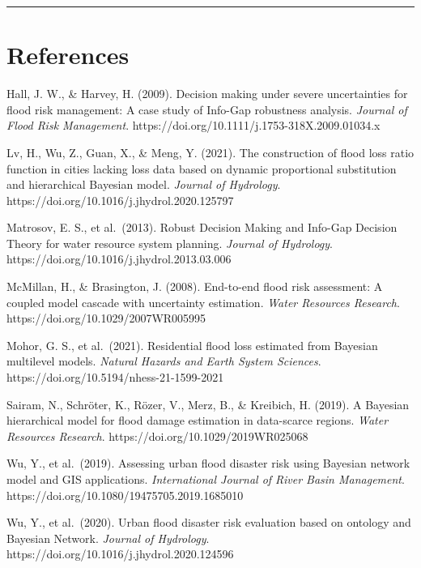 \documentclass[
]{article}
\begin{document}
\begin{center}\rule{0.5\linewidth}{0.5pt}\end{center}

\section{References}\label{references}

Hall, J. W., \& Harvey, H. (2009). Decision making under severe
uncertainties for flood risk management: A case study of Info-Gap
robustness analysis. \emph{Journal of Flood Risk Management}.
https://doi.org/10.1111/j.1753-318X.2009.01034.x

Lv, H., Wu, Z., Guan, X., \& Meng, Y. (2021). The construction of flood
loss ratio function in cities lacking loss data based on dynamic
proportional substitution and hierarchical Bayesian model. \emph{Journal
of Hydrology}. https://doi.org/10.1016/j.jhydrol.2020.125797

Matrosov, E. S., et al.~(2013). Robust Decision Making and Info-Gap
Decision Theory for water resource system planning. \emph{Journal of
Hydrology}. https://doi.org/10.1016/j.jhydrol.2013.03.006

McMillan, H., \& Brasington, J. (2008). End-to-end flood risk
assessment: A coupled model cascade with uncertainty estimation.
\emph{Water Resources Research}. https://doi.org/10.1029/2007WR005995

Mohor, G. S., et al.~(2021). Residential flood loss estimated from
Bayesian multilevel models. \emph{Natural Hazards and Earth System
Sciences}. https://doi.org/10.5194/nhess-21-1599-2021

Sairam, N., Schröter, K., Rözer, V., Merz, B., \& Kreibich, H. (2019). A
Bayesian hierarchical model for flood damage estimation in data-scarce
regions. \emph{Water Resources Research}.
https://doi.org/10.1029/2019WR025068

Wu, Y., et al.~(2019). Assessing urban flood disaster risk using
Bayesian network model and GIS applications. \emph{International Journal
of River Basin Management}.
https://doi.org/10.1080/19475705.2019.1685010

Wu, Y., et al.~(2020). Urban flood disaster risk evaluation based on
ontology and Bayesian Network. \emph{Journal of Hydrology}.
https://doi.org/10.1016/j.jhydrol.2020.124596
\end{document}
